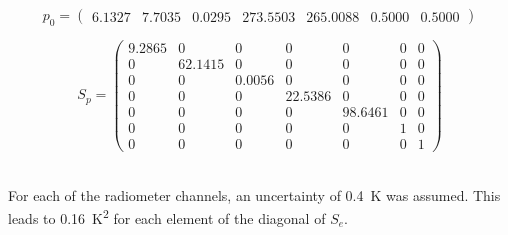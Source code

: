 \documentclass[11pt, a4paper]{article}
\begin{document}
\begin{equation*}
p_0 =
\begin{pmatrix}
   6.1327 & 7.7035 & 0.0295 & 273.5503 & 265.0088 & 0.5000 & 0.5000
\end{pmatrix}
\end{equation*}

\begin{equation*}
S_p =
\begin{pmatrix}
   9.2865 & 0 & 0 & 0 & 0 & 0 & 0 \\
   0 & 62.1415 & 0 & 0 & 0 & 0 & 0 \\
   0 & 0 & 0.0056 & 0 & 0 & 0 & 0 \\
   0 & 0 & 0 & 22.5386 & 0 & 0 & 0 \\
   0 & 0 & 0 & 0 & 98.6461 & 0 & 0 \\
   0 & 0 & 0 & 0 & 0 & 1 & 0 \\
   0 & 0 & 0 & 0 & 0 & 0 & 1
\end{pmatrix}
\end{equation*}

\ \\
For each of the radiometer channels, an uncertainty of \SI{0.4}{K} was assumed. This leads to \SI{0.16}{K^2} for each element of the diagonal of \(S_e\).
\end{document}

